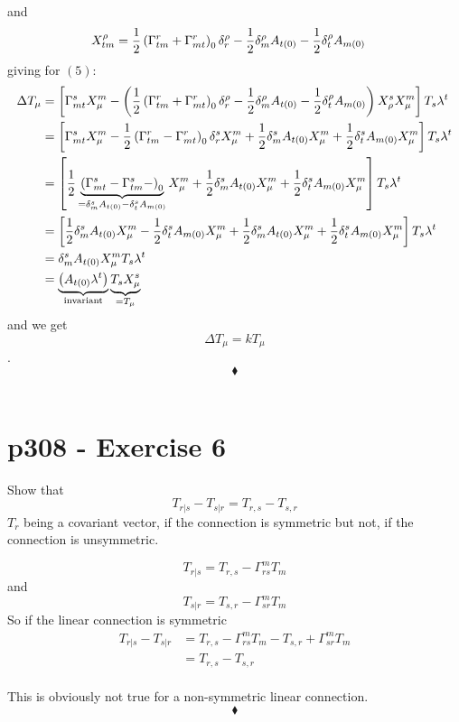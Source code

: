 and 
\begin{align}
X^{\rho}_{tm} &= \frac{1}{2}\left(\Gamma^r_{tm} +\Gamma^r_{mt}\right)_0\delta^{\rho}_r- \frac{1}{2} \delta^{\rho}_m A_{t(0)}- \frac{1}{2} \delta^{\rho}_t A_{m(0)}
\end{align}
giving for $(5)$:
\begin{align*}
\Delta T_{\mu} &= \left[ \Gamma^s_{mt}X^m_{\mu}- \left(\frac{1}{2}\left(\Gamma^r_{tm} +\Gamma^r_{mt}\right)_0\delta^{\rho}_r- \frac{1}{2} \delta^{\rho}_m A_{t(0)}- \frac{1}{2} \delta^{\rho}_t A_{m(0)}\right)X^s_{\rho}X^m_{\mu} \right]T_s\lambda^t\\
 &= \left[ \Gamma^s_{mt}X^m_{\mu}- \frac{1}{2}\left(\Gamma^r_{tm} -\Gamma^r_{mt}\right)_0\delta^{s}_rX^m_{\mu}+ \frac{1}{2} \delta^{s}_m A_{t(0)}X^m_{\mu}+ \frac{1}{2} \delta^{s}_t A_{m(0)}X^m_{\mu}\right]T_s\lambda^t\\
 &= \left[ \frac{1}{2}\underbrace{\left(\Gamma^s_{mt}-\Gamma^s_{tm} -\right)_0}_{=\delta^s_mA_{t(0)} - \delta^s_t A_{m(0)}}X^m_{\mu}+ \frac{1}{2} \delta^{s}_m A_{t(0)}X^m_{\mu}+ \frac{1}{2} \delta^{s}_t A_{m(0)}X^m_{\mu}\right]T_s\lambda^t\\
 &= \left[ \frac{1}{2}\delta^s_mA_{t(0)} X^m_{\mu}- \frac{1}{2}\delta^s_t A_{m(0)}X^m_{\mu}+ \frac{1}{2} \delta^{s}_m A_{t(0)}X^m_{\mu}+ \frac{1}{2} \delta^{s}_t A_{m(0)}X^m_{\mu}\right]T_s\lambda^t\\
 &=  \delta^s_mA_{t(0)} X^m_{\mu}T_s\lambda^t\\
 &= \underbrace{\left(A_{t(0)} \lambda^t\right)}_{\text{invariant}}\underbrace{T_sX^s_{\mu}}_{= T_{\mu}}
\end{align*}
and we get $$\Delta T_{\mu}= kT_{\mu}$$.
$$\blacklozenge$$\\
\newpage



\section{p308 - Exercise 6}
\begin{tcolorbox}
Show that $$T_{r|s} - T_{s|r}= T_{r,s}-T_{s,r}$$
$T_r$ being a covariant vector, if the connection is symmetric but not, if the connection is unsymmetric.
\end{tcolorbox}
$$T_{r|s} = T_{r,s}-\Gamma^m_{rs}T_m$$ and $$T_{s|r} = T_{s,r}-\Gamma^m_{sr}T_m$$
 So if the linear connection is symmetric
\begin{align*}
T_{r|s} - T_{s|r}&= T_{r,s}-\Gamma^m_{rs}T_m-T_{s,r}+\Gamma^m_{sr}T_m\\
&= T_{r,s}-T_{s,r}
\end{align*}\\
This is obviously not true for a non-symmetric linear connection.
$$\blacklozenge$$\\
\newpage

